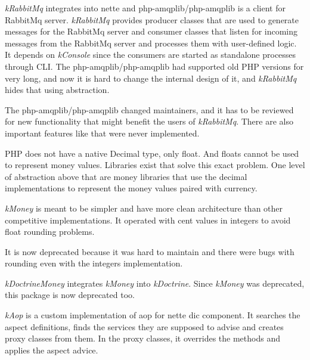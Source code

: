 \textit{\gls{kRabbitMq}} integrates  into \gls{nette} and php-amqplib/php-amqplib is a client for RabbitMq server. \textit{\gls{kRabbitMq}} provides producer classes that are used to generate messages for the RabbitMq server and consumer classes that listen for incoming messages from the RabbitMq server and processes them with user-defined logic. It depends on \textit{\gls{kConsole}} since the consumers are started as standalone processes through CLI. The php-amqplib/php-amqplib had supported old PHP versions for very long, and now it is hard to change the internal design of it, and \textit{\gls{kRabbitMq}} hides that using abstraction.

The php-amqplib/php-amqplib changed maintainers, and it has to be reviewed for new functionality that might benefit the users of \textit{\gls{kRabbitMq}}. There are also important features like  that were never implemented.

 \label{sec:state:money}

PHP does not have a native Decimal type, only float. And floats cannot be used to represent money values. Libraries exist that solve this exact problem. One level of abstraction above that are money libraries that use the decimal implementations to represent the money values paired with currency.

\textit{\gls{kMoney}} is meant to be simpler and have more clean architecture than other competitive implementations. It operated with cent values in integers to avoid float rounding problems.

It is now deprecated because it was hard to maintain and there were bugs with rounding even with the integers implementation.

 \label{sec:state:doctrine-money}

\textit{\gls{kDoctrineMoney}} integrates \textit{\gls{kMoney}} into \textit{\gls{kDoctrine}}. Since \textit{\gls{kMoney}} was deprecated, this package is now deprecated too.

 \label{sec:state:aop}

\textit{\gls{kAop}} is a custom implementation of \gls{aop} for \gls{nette} \gls{dic} component. It searches the aspect definitions, finds the services they are supposed to advise and creates proxy classes from them. In the proxy classes, it overrides the methods and applies the aspect advice.

